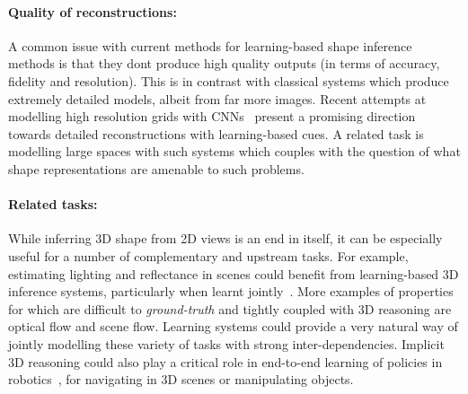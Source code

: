 \documentclass[../thesis.tex]{subfiles}
\begin{document}
\paragraph{Quality of reconstructions:} A common issue with current methods for learning-based shape inference methods is that they dont produce high quality outputs (in terms of accuracy, fidelity and resolution). This is in contrast with classical systems which produce extremely detailed models, albeit from far more images. Recent attempts at modelling high resolution grids with CNNs~\cite{hane2017hierarchical} present a promising direction towards detailed reconstructions with learning-based cues. A related task is modelling large spaces with such systems which couples with the question of what shape representations are amenable to such problems.

\paragraph{Related tasks:} While inferring 3D shape from 2D views is an end in itself, it can be especially useful for a number of complementary and upstream tasks. For example, estimating lighting and reflectance in scenes could benefit from learning-based 3D inference systems, particularly when learnt jointly~\cite{barronPAMI13}. More examples of properties for which are difficult to \textit{ground-truth} and tightly coupled with 3D reasoning are optical flow and scene flow. Learning systems could provide a very natural way of jointly modelling these variety of tasks with strong inter-dependencies. Implicit 3D reasoning could also play a critical role in end-to-end learning of policies in robotics~\cite{finn2016end}, \eg for navigating in 3D scenes or manipulating objects.
\end{document}
